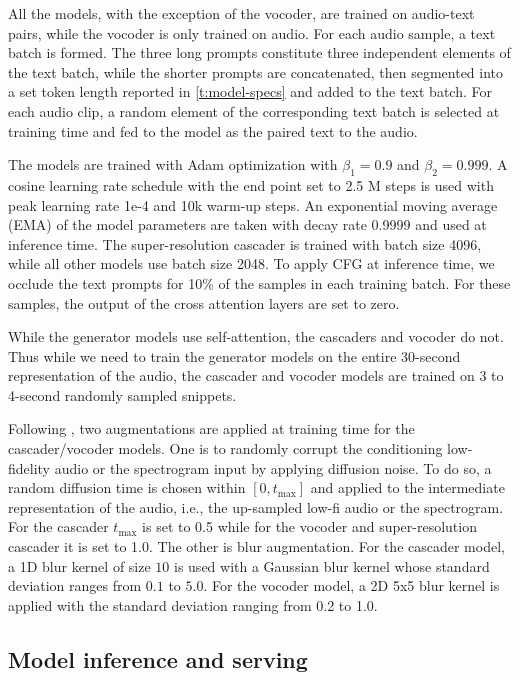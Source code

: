\documentclass[nohyperref]{article}
\theoremstyle{plain}
\theoremstyle{definition}
\theoremstyle{remark}
\begin{document}
All the models, with the exception of the vocoder, are trained on audio-text pairs, while the vocoder is only trained on audio. For each audio sample, a text batch is formed. The three long prompts constitute three independent elements of the text batch, while the shorter prompts are concatenated, then segmented into a set token length reported in \cref{t:model-specs} and added to the text batch. For each audio clip, a random element of the corresponding text batch is selected at training time and fed to the model as the paired text to the audio.

The models are trained with Adam optimization with $\beta_1=0.9$ and $\beta_2=0.999$. A cosine learning rate schedule with the end point set to 2.5 M steps is used with peak learning rate 1e-4 and 10k warm-up steps. An exponential moving average (EMA) of the model parameters are taken with decay rate 0.9999 and used at inference time. The super-resolution cascader is trained with batch size 4096, while all other models use batch size 2048. To apply CFG at inference time, we occlude the text prompts for 10\% of the samples in each training batch. For these samples, the output of the cross attention layers are set to zero.

While the generator models use self-attention, the cascaders and vocoder do not. Thus while we need to train the generator models on the entire 30-second representation of the audio, the cascader and vocoder models are trained on 3 to 4-second randomly sampled snippets.

Following \cite{ho2022cascaded}, two augmentations are applied at training time for the cascader/vocoder models. One is to randomly corrupt the conditioning low-fidelity audio or the spectrogram input by applying diffusion noise. To do so, a random diffusion time is chosen within $[0, t_\text{max}]$ and applied to the intermediate representation of the audio, i.e., the up-sampled low-fi audio or the spectrogram. For the cascader $t_\text{max}$ is set to 0.5 while for the vocoder and super-resolution cascader it is set to 1.0. The other is blur augmentation. For the cascader model, a 1D blur kernel of size $10$ is used with a Gaussian blur kernel whose standard deviation ranges from $0.1$ to $5.0$. For the vocoder model, a 2D 5x5 blur kernel is applied with the standard deviation ranging from 0.2 to 1.0.

\subsection{Model inference and serving}
\end{document}
